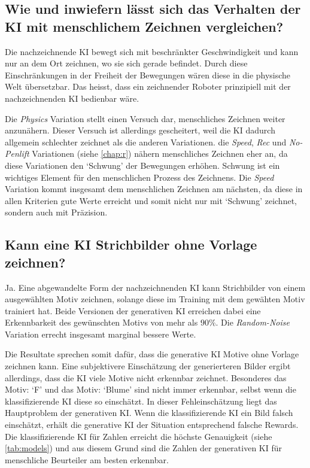 \subsection{Wie und inwiefern lässt sich das Verhalten der KI mit menschlichem Zeichnen vergleichen?}\label{subsub:d_frage_unter_5}

Die nachzeichnende KI bewegt sich mit beschränkter Geschwindigkeit und kann nur
an dem Ort zeichnen, wo sie sich gerade befindet. Durch diese Einschränkungen in
der Freiheit der Bewegungen wären diese in die physische Welt übersetzbar.  Das
heisst, dass ein zeichnender Roboter prinzipiell mit der nachzeichnenden KI
bedienbar wäre.

Die \emph{Physics} Variation stellt einen Versuch dar, menschliches Zeichnen
weiter anzunähern. Dieser Versuch ist allerdings gescheitert, weil die KI
dadurch allgemein schlechter zeichnet als die anderen Variationen. die
\emph{Speed}, \emph{Rec} und \emph{No-Penlift} Variationen (siehe
\ref{chap:r}) nähern menschliches Zeichnen eher an, da diese Variationen
den `Schwung' der Bewegungen erhöhen. Schwung ist ein wichtiges Element für den
menschlichen Prozess des Zeichnens. Die \emph{Speed} Variation kommt insgesamt
dem menschlichen Zeichnen am nächsten, da diese in allen Kriterien gute Werte
erreicht und somit nicht nur mit `Schwung' zeichnet, sondern auch mit Präzision.


\subsection{Kann eine KI Strichbilder ohne Vorlage
zeichnen?}\label{subsub:d_frage_unter_6} Ja. Eine abgewandelte Form der
nachzeichnenden KI kann Strichbilder von einem ausgewählten Motiv zeichnen,
solange diese im Training mit dem gewähten Motiv trainiert hat. Beide Versionen der
generativen KI erreichen dabei eine Erkennbarkeit des gewünschten Motivs von
mehr als $90\%$. Die \emph{Random-Noise} Variation errecht insgesamt marginal bessere
Werte.

Die Resultate sprechen somit dafür, dass die generative KI Motive ohne Vorlage
zeichnen kann. Eine subjektivere Einschätzung der generierteren Bilder ergibt
allerdings, dass die KI viele Motive nicht erkennbar zeichnet. Besonderes das
Motiv: `F' und das Motiv: `Blume' sind nicht immer erkennbar, selbst wenn die
klassifizierende KI diese so einschätzt. In dieser Fehleinschätzung liegt das
Hauptproblem der generativen KI. Wenn die klassifizierende KI ein Bild falsch
einschätzt, erhält die generative KI der Situation entsprechend falsche Rewards.
Die klassifizierende KI für Zahlen erreicht die höchste Genauigkeit (siehe
\ref{tab:models}) und aus diesem Grund sind die Zahlen der generativen KI für
menschliche Beurteiler am besten erkennbar.

